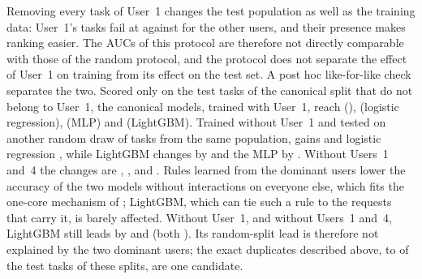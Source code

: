 Removing every task of User~1 changes the test population as well as the training data: User~1's tasks fail at  against  for the other users, and their presence makes ranking easier. The AUCs of this protocol are therefore not directly comparable with those of the random protocol, and the protocol does not separate the effect of User~1 on training from its effect on the test set. A post hoc like-for-like check separates the two. Scored only on the  test tasks of the canonical split that do not belong to User~1, the canonical models, trained with User~1, reach  (\kaam{}),  (logistic regression),  (MLP) and  (LightGBM). Trained without User~1 and tested on another random draw of tasks from the same population, \kaam{} gains  and logistic regression , while LightGBM changes by  and the MLP by . Without Users~1 and~4 the changes are , ,  and . Rules learned from the dominant users lower the accuracy of the two models without interactions on everyone else, which fits the one-core mechanism of ; LightGBM, which can tie such a rule to the requests that carry it, is barely affected. Without User~1, and without Users~1 and~4, LightGBM still leads \kaam{} by  and  (both ). Its random-split lead is therefore not explained by the two dominant users; the exact duplicates described above,  to  of the test tasks of these splits, are one candidate.


